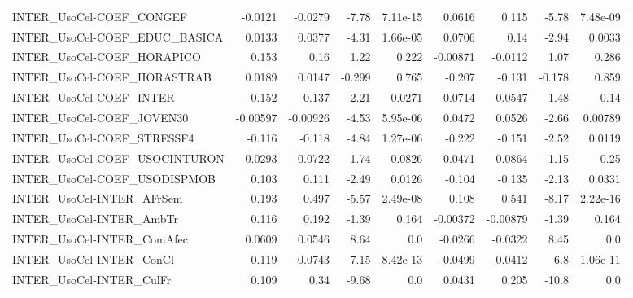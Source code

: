 \begin{tabular}{lrrrrrrrr}
INTER\_UsoCel-COEF\_CONGEF              &     -0.0121 &      -0.0279 &    -7.78 & 7.11e-15 &     0.0616 &       0.115 &        -5.78 &      7.48e-09 \\
INTER\_UsoCel-COEF\_EDUC\_BASICA         &      0.0133 &       0.0377 &    -4.31 & 1.66e-05 &     0.0706 &        0.14 &        -2.94 &        0.0033 \\
INTER\_UsoCel-COEF\_HORAPICO            &       0.153 &         0.16 &     1.22 &    0.222 &   -0.00871 &     -0.0112 &         1.07 &         0.286 \\
INTER\_UsoCel-COEF\_HORASTRAB           &      0.0189 &       0.0147 &   -0.299 &    0.765 &     -0.207 &      -0.131 &       -0.178 &         0.859 \\
INTER\_UsoCel-COEF\_INTER               &      -0.152 &       -0.137 &     2.21 &   0.0271 &     0.0714 &      0.0547 &         1.48 &          0.14 \\
INTER\_UsoCel-COEF\_JOVEN30             &    -0.00597 &     -0.00926 &    -4.53 & 5.95e-06 &     0.0472 &      0.0526 &        -2.66 &       0.00789 \\
INTER\_UsoCel-COEF\_STRESSF4            &      -0.116 &       -0.118 &    -4.84 & 1.27e-06 &     -0.222 &      -0.151 &        -2.52 &        0.0119 \\
INTER\_UsoCel-COEF\_USOCINTURON         &      0.0293 &       0.0722 &    -1.74 &   0.0826 &     0.0471 &      0.0864 &        -1.15 &          0.25 \\
INTER\_UsoCel-COEF\_USODISPMOB          &       0.103 &        0.111 &    -2.49 &   0.0126 &     -0.104 &      -0.135 &        -2.13 &        0.0331 \\
INTER\_UsoCel-INTER\_AFrSem             &       0.193 &        0.497 &    -5.57 & 2.49e-08 &      0.108 &       0.541 &        -8.17 &      2.22e-16 \\
INTER\_UsoCel-INTER\_AmbTr              &       0.116 &        0.192 &    -1.39 &    0.164 &   -0.00372 &    -0.00879 &        -1.39 &         0.164 \\
INTER\_UsoCel-INTER\_ComAfec            &      0.0609 &       0.0546 &     8.64 &      0.0 &    -0.0266 &     -0.0322 &         8.45 &           0.0 \\
INTER\_UsoCel-INTER\_ConCl              &       0.119 &       0.0743 &     7.15 & 8.42e-13 &    -0.0499 &     -0.0412 &          6.8 &      1.06e-11 \\
INTER\_UsoCel-INTER\_CulFr              &       0.109 &         0.34 &    -9.68 &      0.0 &     0.0431 &       0.205 &        -10.8 &           0.0 \\

\end{tabular}
